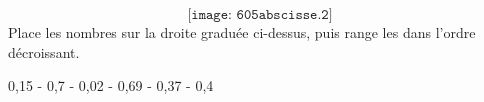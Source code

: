 \[\texttt{[image: 605abscisse.2]}\]
Place les nombres sur la droite graduée ci-dessus, puis range les dans l'ordre décroissant.
\begin{center}
  0,15 - 0,7 - 0,02 - 0,69 - 0,37 - 0,4
\end{center}